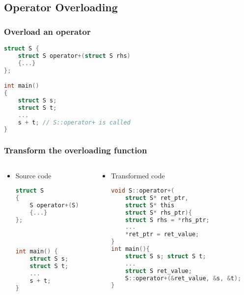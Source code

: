 \documentclass{beamer}
\begin{document}
\subsection{Operator Overloading}

\begin{frame}[fragile]
    \frametitle{Overload an operator}

    \begin{lstlisting}[language=C]
struct S {
    struct S operator+(struct S rhs)
    {...}
};

int main()
{
    struct S s;
    struct S t;
    ...
    s + t; // S::operator+ is called
}
    \end{lstlisting}
\end{frame}

\begin{frame}[fragile]
    \frametitle{Transform the overloading function}
    \begin{columns}
        \begin{column}[]{0.4\textwidth}
            \begin{itemize}
                \item Source code
                      \small
                      \begin{lstlisting}[language=C]
struct S
{
    S operator+(S)
    {...}
};



int main() {
    struct S s;
    struct S t;
    ...
    s + t;
}
                    \end{lstlisting}
            \end{itemize}

        \end{column}

        \begin{column}[]{0.8\textwidth}
            \begin{itemize}
                \item Transformed code
                      \small
                      \begin{lstlisting}[language=C]
void S::operator+(
    struct S* ret_ptr, 
    struct S* this
    struct S* rhs_ptr){
    struct S rhs = *rhs_ptr;
    ...
    *ret_ptr = ret_value;
}
int main(){
    struct S s; struct S t;
    ...
    struct S ret_value;
    S::operator+(&ret_value, &s, &t);
}
                \end{lstlisting}
            \end{itemize}
        \end{column}
    \end{columns}
\end{frame}
\end{document}
